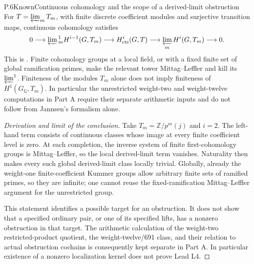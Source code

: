 \begin{result}{P.6}{Known}{Continuous cohomology and the scope of a derived-limit obstruction}
For \(T=\varprojlim_m T_m\), with finite discrete coefficient modules
and surjective transition maps, continuous cohomology satisfies
\[
0\longrightarrow\varprojlim{}^1_m H^{i-1}(G,T_m)
\longrightarrow H^i_{\rm cts}(G,T)
\longrightarrow\varprojlim_m H^i(G,T_m)\longrightarrow0.
\]
This is \citet[equation (2.1) and Theorem (2.2), p.~215;
Proposition (1.6), p.~211]{CohJannsen1988}.
Finite cohomology groups at a local field, or with a fixed finite set of
global ramification primes, make the relevant tower Mittag--Leffler and
kill its \(\varprojlim^1\). Finiteness of the modules \(T_m\)
alone does not imply finiteness of \(H^1(G_{\mathbb Q},T_m)\).
In particular the unrestricted weight-two and weight-twelve computations
in Part A require their separate arithmetic inputs and do not follow
from Jannsen's formalism alone.
\end{result}
\begin{proof}[Derivation and limit of the conclusion]
Take \(T_m=\mathbb Z/p^m(j)\) and \(i=2\).
The left-hand term consists of continuous classes whose image at every
finite coefficient level is zero. At each completion, the inverse system
of finite first-cohomology groups is Mittag--Leffler, so the local
derived-limit term vanishes. Naturality then makes every such global
derived-limit class locally trivial. Globally, already the weight-one
finite-coefficient Kummer groups allow arbitrary finite sets of ramified
primes, so they are infinite; one cannot reuse the fixed-ramification
Mittag--Leffler argument for the unrestricted group.

This statement identifies a possible target for an obstruction. It does
not show that a specified ordinary pair, or one of its specified lifts,
has a nonzero obstruction in that target. The arithmetic calculation of
the weight-two restricted-product quotient, the weight-twelve/691 class,
and their relation to actual obstruction cochains is consequently kept
separate in Part A. In particular existence of a nonzero localization
kernel does not prove Lead L4.
\end{proof}

